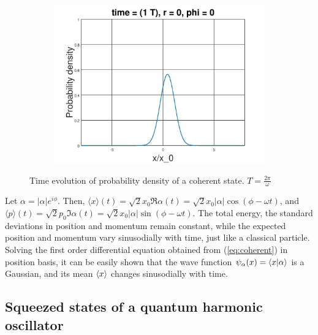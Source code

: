 \documentclass[12pt, twoside]{article}
\begin{document}
\begin{figure}[h!]
\begin{subfigure}[h!]{0.3\linewidth}
	\includegraphics[width=\linewidth]{graphs/coherent/8.jpg}
\end{subfigure}
	\caption{Time evolution of probability density of a coherent state. $T = \frac{2\pi}{\omega}$}
\end{figure}
Let $\alpha = |\alpha|e^{i\phi}$. Then, $\langle x \rangle (t) $$= \sqrt{2} x_0 \Re{\alpha(t)} $$= \sqrt{2} x_0 |\alpha| \cos(\phi-\omega t)$, and $ \langle p \rangle (t) $$= \sqrt{2} p_0 \Im{\alpha(t)} $$= \sqrt{2} x_0 |\alpha| \sin(\phi-\omega t)$. The total energy, the standard deviations in position and momentum remain constant, while the expected position and momentum vary sinusodially with time, just like a classical particle. Solving the first order differential equation obtained from (\ref{eq:coherent}) in position basis, it can be easily shown that the wave function $\psi_\alpha (x) = \braket{x}{\alpha}$ is a Gaussian, and its mean $\expval{x}$ changes sinusodially with time.
\subsection{Squeezed states of a quantum harmonic oscillator}
\end{document}

